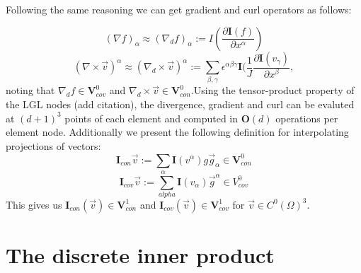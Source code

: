 \documentclass{report}
\numberwithin{equation}{section}
\begin{document}
Following the same reasoning we can get gradient and curl operators as follows:

\begin{equation}
    (\nabla f)_{\alpha} \approx (\nabla_d f)_{\alpha}:=I(\frac{\partial \mathbf{I}(f)}{\partial x^{\alpha}}) 
\end{equation}
\begin{equation}
    (\nabla \times \overrightarrow{v})^{\alpha} \approx (\nabla_d \times \overrightarrow{v})^{\alpha} := \sum_{\beta,\gamma} \epsilon^{\alpha \beta \gamma} \mathbf{I}(\frac{1}{J}\frac{\partial \mathbf{I}(v_{\gamma})}{\partial x^{\beta}},
\end{equation}
noting that $\nabla_d f \in \mathbf{V}_{cov}^0$ and $\nabla_d \times \overrightarrow{v} \in \mathbf{V}_{con}^0$.Using the tensor-product property of the LGL nodes (add citation), the divergence, gradient and curl can be evaluted at $(d+1)^3$ points of each element and computed in $\mathbf{O}(d)$ operations per element node. Additionally we present the following definition for interpolating projections of vectors:
\begin{equation}
    \mathbf{I}_{con} \overrightarrow{v}:=\sum_{\alpha}\mathbf{I}(v^{\alpha})g\overrightarrow{g}_{\alpha} \in \mathbf{V}_{con}^0
\end{equation}
\begin{equation}
    \mathbf{I}_{cov}\overrightarrow{v}:=\sum_{alpha}\mathbf{I}(v_{\alpha})\overrightarrow{g}^{\alpha} \in V_{cov}^0
\end{equation}
This gives us $\mathbf{I}_{con}(\overrightarrow{v}) \in \mathbf{V}_{con}^1$ and $\mathbf{I}_{cov}(\overrightarrow{v}) \in \mathbf{V}_{cov}^1$ for $\overrightarrow{v} \in C^0(\Omega)^3$.

\section{The discrete inner product}



\end{document}
